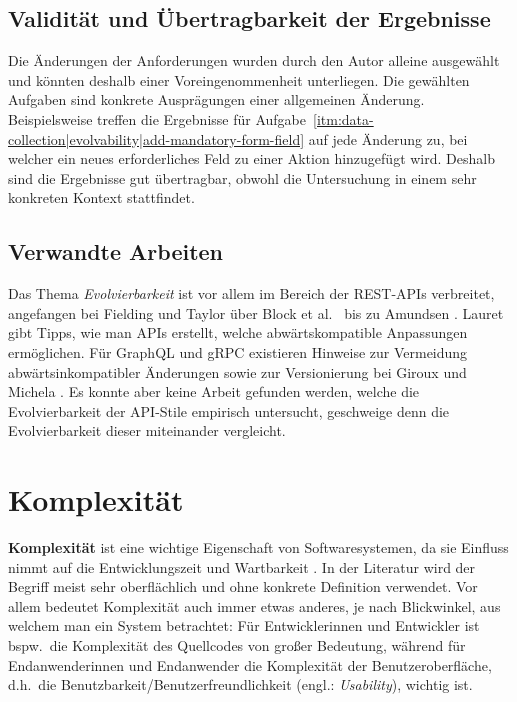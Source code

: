 \subsection{Validität und Übertragbarkeit der Ergebnisse}
Die Änderungen der Anforderungen wurden durch den Autor alleine ausgewählt und könnten deshalb einer Voreingenommenheit unterliegen. Die gewählten Aufgaben sind konkrete Ausprägungen einer allgemeinen Änderung. Beispielsweise treffen die Ergebnisse für Aufgabe~\ref{itm:data-collection|evolvability|add-mandatory-form-field} auf jede Änderung zu, bei welcher ein neues erforderliches Feld zu einer Aktion hinzugefügt wird. Deshalb sind die Ergebnisse gut übertragbar, obwohl die Untersuchung in einem sehr konkreten Kontext stattfindet.

\subsection{Verwandte Arbeiten}
Das Thema \textit{Evolvierbarkeit} ist vor allem im Bereich der REST-APIs verbreitet, angefangen bei Fielding und Taylor \autocite{Fielding2000} über Block et al.\ \autocite{Block2014} bis zu Amundsen \autocite{Amundsen2017}. Lauret \autocite{Lauret2019} gibt Tipps, wie man APIs erstellt, welche abwärtskompatible Anpassungen ermöglichen. Für GraphQL und gRPC existieren Hinweise zur Vermeidung abwärtsinkompatibler Änderungen sowie zur Versionierung bei Giroux \autocite{Giroux2020} und Michela \autocite{Michela2020}. Es konnte aber keine Arbeit gefunden werden, welche die Evolvierbarkeit der API-Stile empirisch untersucht, geschweige denn die Evolvierbarkeit dieser miteinander vergleicht.

\section{Komplexität}\label{sec:comp-criteria|complexity}

\textbf{Komplexität} ist eine wichtige Eigenschaft von Softwaresystemen, da sie Einfluss nimmt auf die Entwicklungszeit und Wartbarkeit \autocite{Tsaur1998}. In der Literatur wird der Begriff meist sehr oberflächlich und ohne konkrete Definition verwendet. Vor allem bedeutet Komplexität auch immer etwas anderes, je nach Blickwinkel, aus welchem man ein System betrachtet: Für Entwicklerinnen und Entwickler ist bspw.\ die Komplexität des Quellcodes von großer Bedeutung, während für Endanwenderinnen und Endanwender die Komplexität der Benutzeroberfläche, d.h.\ die Benutzbarkeit/Benutzerfreundlichkeit (engl.: \textit{Usability}), wichtig ist.

